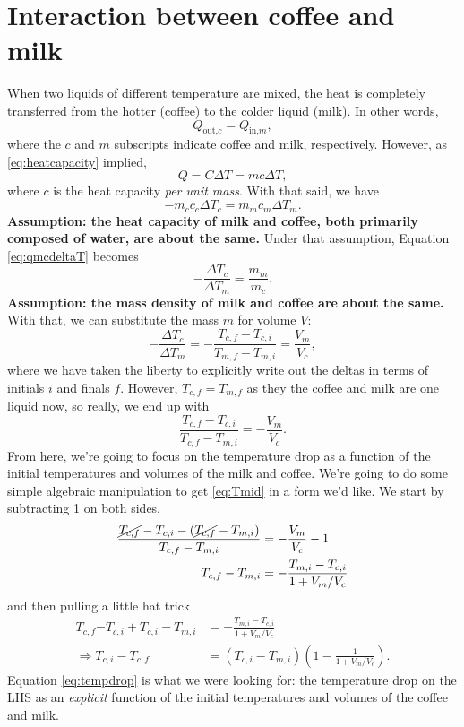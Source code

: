 \documentclass[11pt]{article}
\begin{document}
\section{Interaction between coffee and milk}

When two liquids of different temperature are mixed, the heat is completely transferred from the hotter (coffee) to the colder liquid (milk). In other words,
\[
Q_{\text{out,}c} = Q_{\text{in,}m},
\]
where the $c$ and $m$ subscripts indicate coffee and milk, respectively. However, as \eqref{eq:heatcapacity} implied,
\[
Q = C\Delta T = mc\Delta T,
\]
where $c$ is the heat capacity \textit{per unit mass}. With that said, we have
\begin{equation}
-m_{c} c_{c} \Delta T_{c} = m_{m} c_{m} \Delta T_{m} \label{eq:qmcdeltaT}.
\end{equation}
\textbf{Assumption: the heat capacity of milk and coffee, both primarily composed of water, are about the same.} Under that assumption, Equation \eqref{eq:qmcdeltaT} becomes
\[
-\frac{\Delta T_{c}}{\Delta T_{m}} = \frac{m_{m}}{m_{c}}.
\]
\textbf{Assumption: the mass density of milk and coffee are about the same.} With that, we can substitute the mass $m$ for volume $V$:
\[
-\frac{\Delta T_{c}}{\Delta T_{m}} = -\frac{T_{c,f} - T_{c,i}}{T_{m,f} - T_{m,i}} = \frac{V_{m}}{V_{c}},
\]
where we have taken the liberty to explicitly write out the deltas in terms of initials $i$ and finals $f$. However, $T_{c,f} = T_{m,f}$ as they the coffee and milk are one liquid now, so really, we end up with
\begin{equation}
\frac{T_{c,f} - T_{c,i}}{T_{c,f} - T_{m,i}} = -\frac{V_{m}}{V_{c}}. \label{eq:Tmid}
\end{equation}
From here, we're going to focus on the temperature drop as a function of the initial temperatures and volumes of the milk and coffee. We're going to do some simple algebraic manipulation to get \eqref{eq:Tmid} in a form we'd like. We start by subtracting 1 on both sides,
\begin{align*}
\frac{\cancel{T_{c,f}} - T_{c,i} - (\cancel{T_{c,f}} - T_{m,i})}{T_{c,f} - T_{m,i}} &= -\frac{V_{m}}{V_{c}} - 1 \\
T_{c,f} - T_{m,i} &= -\frac{T_{m,i} - T_{c,i}}{1 + V_{m}/V_{c}} 
\end{align*}
and then pulling a little hat trick
\begin{align}
T_{c,f} \boxed{- T_{c,i} + T_{c,i}} - T_{m,i} &= -\frac{T_{m,i} - T_{c,i}}{1 + V_{m}/V_{c}} \nonumber \\
\Rightarrow T_{c,i} - T_{c,f} &= (T_{c,i} - T_{m,i})\left(1 - \frac{1}{1+V_{m}/V_{c}}\right). \label{eq:tempdrop}
\end{align}
Equation \eqref{eq:tempdrop} is what we were looking for: the temperature drop on the LHS as an \textit{explicit} function of the initial temperatures and volumes of the coffee and milk.
\end{document}
